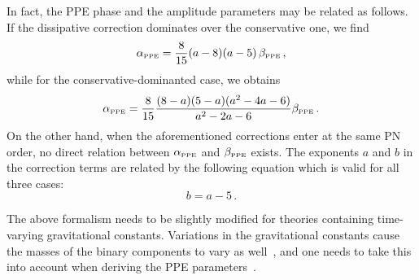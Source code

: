 \documentclass[prd,twocolumn,nofootinbib]{revtex4-1}
\newcommand{\PPE}{{\mbox{\tiny PPE}}}
\begin{document}
In fact, the PPE phase and the amplitude parameters may be related as follows. If the dissipative correction dominates over the conservative one, we find
\begin{equation}\label{eq:2w2}
\alpha_{\PPE} = \frac{8}{15} (a-8)(a-5) \, \beta_{\PPE}\,,
\end{equation}
while for the conservative-dominanted case, we obtains
\begin{equation}\label{eq:2w3}
\alpha_{\PPE} =\frac{8}{15} \frac{(8-a)(5-a)(a^2-4a-6)}{a^2-2a-6} \beta_{\PPE}\,.
\end{equation}
On the other hand, when the aforementioned corrections enter at the same PN order, no direct relation between $\alpha_{\PPE}$ and $\beta_{\PPE}$ exists. The exponents $a$ and $b$ in the correction terms are related by the following equation which is valid for all three cases:
\begin{equation}
b=a-5\,.
\end{equation}


The above formalism needs to be slightly modified for theories containing time-varying gravitational constants. Variations in the gravitational constants cause the masses  of the binary components to vary as well~\cite{PhysRevLett.65.953}, and one needs to take this into account when deriving the PPE parameters~\cite{Tahura:2018zuq}.
\end{document}
